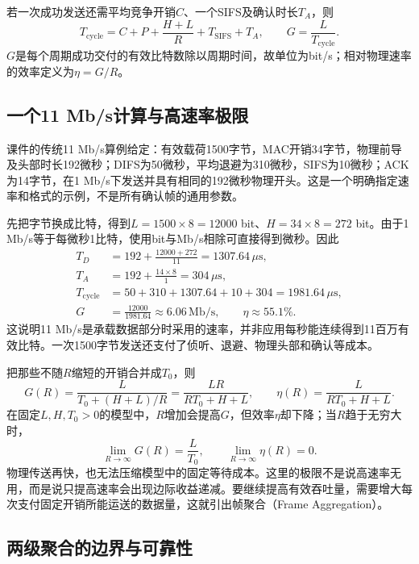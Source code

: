 若一次成功发送还需平均竞争开销$C$、一个SIFS及确认时长$T_A$，则
\begin{equation}
T_{\mathrm{cycle}}=C+P+\frac{H+L}{R}+T_{\mathrm{SIFS}}+T_A,
\qquad G=\frac{L}{T_{\mathrm{cycle}}}.
\end{equation}
$G$是每个周期成功交付的有效比特数除以周期时间，故单位为bit/s；相对物理速率的效率定义为$\eta=G/R$。

\subsection{一个11 Mb/s计算与高速率极限}

课件的传统11 Mb/s算例给定：有效载荷1500字节，MAC开销34字节，物理前导及头部时长192微秒；DIFS为50微秒，平均退避为310微秒，SIFS为10微秒；ACK为14字节，在1 Mb/s下发送并具有相同的192微秒物理开头。这是一个明确指定速率和格式的示例，不是所有确认帧的通用参数。

先把字节换成比特，得到$L=1500\times8=12000$ bit、$H=34\times8=272$ bit。由于1 Mb/s等于每微秒1比特，使用bit与Mb/s相除可直接得到微秒。因此
\begin{align}
T_D&=192+\frac{12000+272}{11}=1307.64\,\mu\mathrm{s},\\
T_A&=192+\frac{14\times8}{1}=304\,\mu\mathrm{s},\\
T_{\mathrm{cycle}}&=50+310+1307.64+10+304
=1981.64\,\mu\mathrm{s},\\
G&=\frac{12000}{1981.64}\approx6.06\,\mathrm{Mb/s},\qquad
\eta\approx55.1\%.
\end{align}
这说明11 Mb/s是承载数据部分时采用的速率，并非应用每秒能连续得到11百万有效比特。一次1500字节发送还支付了侦听、退避、物理头部和确认等成本。

把那些不随$R$缩短的开销合并成$T_0$，则
\begin{equation}
G(R)=\frac{L}{T_0+(H+L)/R}
=\frac{LR}{RT_0+H+L},\qquad
\eta(R)=\frac{L}{RT_0+H+L}.
\end{equation}
在固定$L,H,T_0>0$的模型中，$R$增加会提高$G$，但效率$\eta$却下降；当$R$趋于无穷大时，
\begin{equation}
\lim_{R\to\infty}G(R)=\frac{L}{T_0},\qquad
\lim_{R\to\infty}\eta(R)=0.
\end{equation}
物理传送再快，也无法压缩模型中的固定等待成本。这里的极限不是说高速率无用，而是说只提高速率会出现边际收益递减。要继续提高有效吞吐量，需要增大每次支付固定开销所能运送的数据量，这就引出帧聚合（Frame Aggregation）。

\subsection{两级聚合的边界与可靠性}

